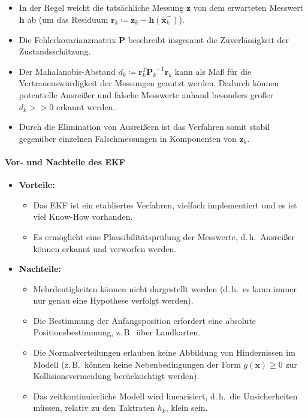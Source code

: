 \documentclass[a4paper, 11pt, accentcolor = tud3b]{tudreport}
\newcommand{\mat}[1]{\boldsymbol{#1}}
\renewcommand{\vec}[1]{\boldsymbol{\mathbf{#1}}}
\renewcommand{\dh}{d.\,h.~}
\newcommand{\zB}{z.\,B.~}
\begin{document}
						\begin{itemize}
							\item In der Regel weicht die tatsächliche Messung \( \vec{z} \) von dem erwarteten Messwert \( \vec{h} \) ab (um das Residuum \( \vec{r}_k \coloneqq \vec{z}_k - \vec{h}(\hat{\vec{x}}_k^-) \)).
							\item Die Fehlerkovarianzmatrix \( \mat{P} \) beschreibt insgesamt die Zuverlässigkeit der Zustandsschätzung.
							\item Der Mahalanobis-Abstand \( d_k \coloneqq \vec{r}_k^T \mat{P}_k^{\,-1} \vec{r}_k \) kann als Maß für die Vertrauenswürdigkeit der Messungen genutzt werden. Dadurch können potentielle Ausreißer und falsche Messwerte anhand besonders großer \( d_k >> 0 \) erkannt werden.
							\item Durch die Elimination von Ausreißern ist das Verfahren somit stabil gegenüber einzelnen Falschmessungen in Komponenten von \( \vec{z}_k \).
						\end{itemize}
					
					\paragraph{Vor- und Nachteile des EKF}
						\begin{itemize}
							\item \textbf{Vorteile:}
								\begin{itemize}
									\item Das EKF ist ein etabliertes Verfahren, vielfach implementiert und es ist viel Know-How vorhanden.
									\item Es ermöglicht eine Plausibilitätsprüfung der Messwerte, \dh Ausreißer können erkannt und verworfen werden.
								\end{itemize}
							\item \textbf{Nachteile:}
								\begin{itemize}
									\item Mehrdeutigkeiten können nicht dargestellt werden (\dh es kann immer nur genau eine Hypothese verfolgt werden).
									\item Die Bestimmung der Anfangsposition erfordert eine absolute Positionsbestimmung, \zB über Landkarten.
									\item Die Normalverteilungen erlauben keine Abbildung von Hindernissen im Modell (\zB können keine Nebenbedingungen der Form \( g(\vec{x}) \geq 0 \) zur Kollisionsvermeidung berücksichtigt werden).
									\item Das zeitkontinuierliche Modell wird linearisiert, \dh die Unsicherheiten müssen, relativ zu den Taktraten \( h_k \), klein sein.
								\end{itemize}
						\end{itemize}
\end{document}
